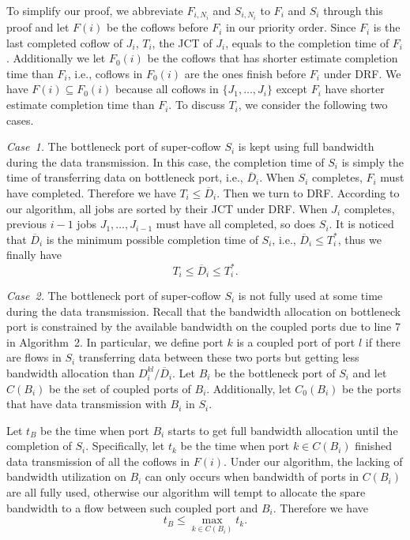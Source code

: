 \documentclass[10pt, conference, letterpaper]{IEEEtran}
\begin{document}
\begin{IEEEproof}
To simplify our proof, we abbreviate $F_{i,N_i}$ and $S_{i,N_i}$ to $F_i$ and $S_i$ through this proof and let $F(i)$ be the coflows before $F_i$ in our priority order. Since $F_i$ is the last completed coflow of $J_i$, $T_i$, the JCT of $J_i$, equals to the completion time of $F_i$. Additionally we let $F_0(i)$ be the coflows that has shorter estimate completion time than $F_i$, i.e., coflows in $F_0(i)$ are the ones finish before $F_i$ under DRF. We have $F(i) \subseteq F_0(i)$ because all coflows in $\{J_1,\dots,J_i\}$ except $F_i$ have shorter estimate completion time than $F_i$. To discuss $T_i$, we consider the following two cases. 

\emph{Case~1.} The bottleneck port of super-coflow $S_i$ is kept using full bandwidth during the data transmission. In this case, the completion time of $S_i$ is simply the time of transferring data on bottleneck port, i.e., $\overline{D}_i$. When $S_i$ completes, $F_i$ must have completed. Therefore we have $T_i \leq \overline{D}_i$. Then we turn to DRF. According to our algorithm, all jobs are sorted by their JCT under DRF. When $J_i$ completes, previous $i-1$ jobs $J_1,\dots,J_{i-1}$ must have all completed, so does $S_i$. It is noticed that $\overline{D}_i$ is the minimum possible completion time of $S_i$, i.e., $\overline{D}_i \leq T_i^*$, thus we finally have
\begin{equation}\label{case1}
	T_i \leq \overline{D}_i \leq T_i^*.
\end{equation}

\emph{Case~2.} The bottleneck port of super-coflow $S_i$ is not fully used at some time during the data transmission. Recall that the bandwidth allocation on bottleneck port is constrained by the available bandwidth on the coupled ports due to line 7 in Algorithm~2. In particular, we define port $k$ is a coupled port of port $l$ if there are flows in $S_i$ transferring data between these two ports but getting less bandwidth allocation than $D_i^{kl}/\overline{D}_i$. Let $B_i$ be the bottleneck port of $S_i$ and let $C(B_i)$ be the set of coupled ports of $B_i$. Additionally, let $C_0(B_i)$ be the ports that have data transmission with $B_i$ in $S_i$.

Let $t_B$ be the time when port $B_i$ starts to get full bandwidth allocation until the completion of $S_i$. Specifically, let $t_k$ be the time when port $k$$\in$$C(B_i)$ finished data transmission of all the coflows in $F(i)$. Under our algorithm, the lacking of bandwidth utilization on $B_i$ can only occurs when bandwidth of ports in $C(B_i)$ are all fully used, otherwise our algorithm will tempt to allocate the spare bandwidth to a flow between such coupled port and $B_i$. Therefore we have
\begin{equation}
	t_B \leq \max_{k \in C(B_i)} t_k.
\end{equation}


\end{IEEEproof}
\end{document}
